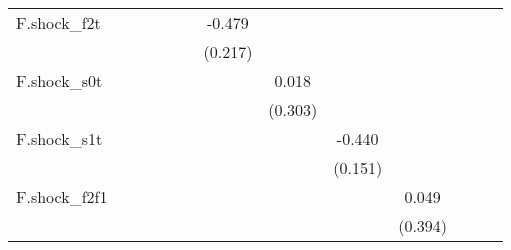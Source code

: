 {\begin{tabular}{l*{12}{c}}
\addlinespace
F.shock\_f2t &                     &                     &                     &                     &                     &      -0.479\sym{**} &                     &                     &                     &                     &                     &                     \\
            &                     &                     &                     &                     &                     &     (0.217)         &                     &                     &                     &                     &                     &                     \\
\addlinespace
F.shock\_s0t &                     &                     &                     &                     &                     &                     &       0.018         &                     &                     &                     &                     &                     \\
            &                     &                     &                     &                     &                     &                     &     (0.303)         &                     &                     &                     &                     &                     \\
\addlinespace
F.shock\_s1t &                     &                     &                     &                     &                     &                     &                     &      -0.440\sym{**} &                     &                     &                     &                     \\
            &                     &                     &                     &                     &                     &                     &                     &     (0.151)         &                     &                     &                     &                     \\
\addlinespace
F.shock\_f2f1&                     &                     &                     &                     &                     &                     &                     &                     &       0.049         &                     &                     &                     \\
            &                     &                     &                     &                     &                     &                     &                     &                     &     (0.394)         &                     &                     &                     \\

\end{tabular}}
